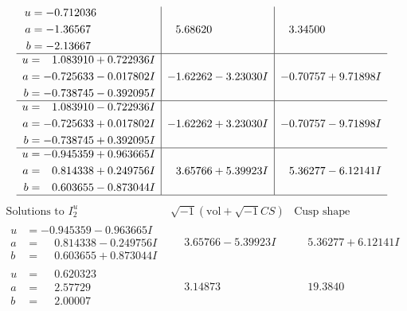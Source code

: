 \documentclass[1p]{elsarticle_modified}
\theoremstyle{definition}
\newcommand{\I}{\sqrt{-1}}
\begin{document}
$$\begin{array}{c|c|c}
\begin{aligned}
u &= -0.712036\phantom{ +0.000000I} \\
a &= -1.36567\phantom{ +0.000000I} \\
b &= -2.13667\phantom{ +0.000000I}\end{aligned}
 & \phantom{-}5.68620\phantom{ +0.000000I} & \phantom{-}3.34500\phantom{ +0.000000I} \\ \hline\begin{aligned}
u &= \phantom{-}1.083910 + 0.722936 I \\
a &= -0.725633 - 0.017802 I \\
b &= -0.738745 - 0.392095 I\end{aligned}
 & -1.62262 - 3.23030 I & -0.70757 + 9.71898 I \\ \hline\begin{aligned}
u &= \phantom{-}1.083910 - 0.722936 I \\
a &= -0.725633 + 0.017802 I \\
b &= -0.738745 + 0.392095 I\end{aligned}
 & -1.62262 + 3.23030 I & -0.70757 - 9.71898 I \\ \hline\begin{aligned}
u &= -0.945359 + 0.963665 I \\
a &= \phantom{-}0.814338 + 0.249756 I \\
b &= \phantom{-}0.603655 - 0.873044 I\end{aligned}
 & \phantom{-}3.65766 + 5.39923 I & \phantom{-}5.36277 - 6.12141 I\\
 \hline 
 \end{array}$$\newpage$$\begin{array}{c|c|c}  
\text{Solutions to }I^u_{2}& \I (\text{vol} + \sqrt{-1}CS) & \text{Cusp shape}\\
 \hline 
\begin{aligned}
u &= -0.945359 - 0.963665 I \\
a &= \phantom{-}0.814338 - 0.249756 I \\
b &= \phantom{-}0.603655 + 0.873044 I\end{aligned}
 & \phantom{-}3.65766 - 5.39923 I & \phantom{-}5.36277 + 6.12141 I \\ \hline\begin{aligned}
u &= \phantom{-}0.620323\phantom{ +0.000000I} \\
a &= \phantom{-}2.57729\phantom{ +0.000000I} \\
b &= \phantom{-}2.00007\phantom{ +0.000000I}\end{aligned}
 & \phantom{-}3.14873\phantom{ +0.000000I} & \phantom{-}19.3840\phantom{ +0.000000I} \\ \hline\begin{aligned}

\end{aligned}
\end{array}$$
\end{document}

